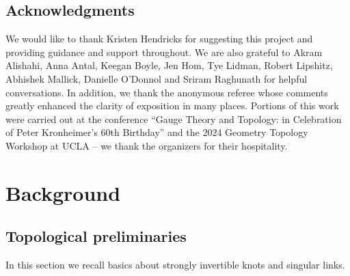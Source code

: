 \documentclass[11pt]{amsart}
\theoremstyle{definition}
\theoremstyle{remark}
\numberwithin{equation}{section}
\begin{document}
\subsection*{Acknowledgments}We would like to thank Kristen Hendricks for suggesting this project
and providing guidance and support throughout. We are also grateful to Akram Alishahi,
Anna Antal, Keegan Boyle, Jen Hom, Tye Lidman, Robert Lipshitz, Abhishek Mallick, Danielle O'Donnol and Sriram Raghunath for helpful conversations. In addition, we thank the anonymous referee whose comments greatly enhanced the clarity of exposition in many places. Portions of this work were carried out at the conference ``Gauge Theory and Topology: in Celebration of Peter Kronheimer's 60th Birthday'' and the 2024 Geometry Topology Workshop at UCLA -- we thank the organizers for their hospitality.

\section{Background }\label{stro}


\subsection{Topological preliminaries}
In this section we recall basics about strongly invertible knots and singular links. 
\end{document}
